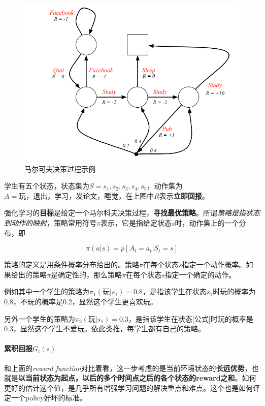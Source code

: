 \documentclass[UTF8,a4paper,12pt]{ctexbook}
\begin{document}
				\begin{figure}[H]
					\centering
					\includegraphics[width=.7\linewidth]{MDP-example2}
					\caption{马尔可夫决策过程示例}
				\end{figure}			
				
				学生有五个状态，状态集为$S = {s_1, s_2, s_3, s_4, s_5}$，动作集为$A={\textit{玩}，\textit{退出}，\textit{学习}，\textit{发论文}，\textit{睡觉}}$，在上图中$R$表示\textbf{立即回报}。
				
				强化学习的\textbf{目标}是给定一个马尔科夫决策过程，\textbf{寻找最优策略}。所谓\textit{策略是指状态到动作的映射}，策略常用符号$\pi$表示，它是指给定状态$s$时，动作集上的一个分布，即
				
				\begin{equation}
					\pi(a|s) = p[A_t = a_t | S_t = s]
				\end{equation}
				
				策略的定义是用条件概率分布给出的。策略$\pi$在每个状态$s$指定一个动作概率。如果给出的策略$\pi$是确定性的，那么策略$\pi$在每个状态$s$指定一个确定的动作。
				
				例如其中一个学生的策略为$\pi_1(\textit{玩}|s_1) = 0.8$，是指该学生在状态$s_1$时玩的概率为0.8，不玩的概率是0.2，显然这个学生更喜欢玩。
				
				另外一个学生的策略为$\pi_2(\textit{玩}|s_1) = 0.3$，是指该学生在状态[公式]时玩的概率是0.3，显然这个学生不爱玩。依此类推，每学生都有自己的策略。
			
			\paragraph{累积回报$G_t(s)$}	
				和上面的\textit{reward function}对比着看，这一步考虑的是当前环境状态的\textbf{长远优势}，也就是\textbf{以当前状态为起点，以后的多个时间点之后的各个状态的reward之和}。如何更好的估计这个值，是几乎所有增强学习问题的解决重点和难点。这个也是如何评定一个policy好坏的标准。
			
\end{document}
